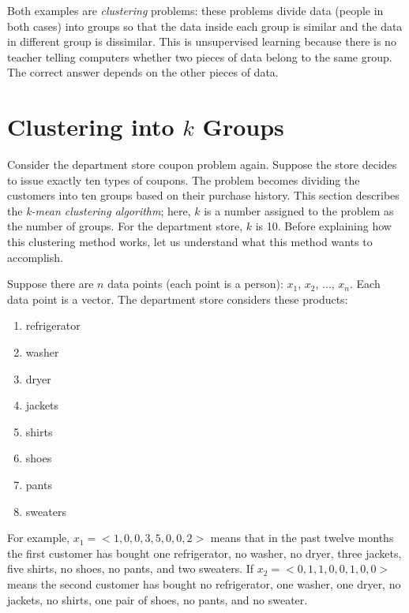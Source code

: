 
Both examples are {\it clustering} problems: these problems divide
data (people in both cases) into groups so that the data inside each
group is similar and the data in different group is dissimilar.  This
is unsupervised learning because there is no teacher telling computers
whether two pieces of data belong to the same group.  The correct
answer depends on the other pieces of data.


\section{Clustering into $k$ Groups}

Consider the department store coupon problem again. Suppose the store
decides to issue exactly ten types of coupons.  The problem becomes
dividing the customers into ten groups based on their purchase
history.  This section describes the {\it k-mean clustering
  algorithm}; here, $k$  is a
number assigned to the problem as the number of groups.  For the
department store, $k$ is 10.  Before explaining how this clustering
method works, let us understand what this method wants to accomplish.

Suppose there are $n$ data points (each point is a person): $x_1$,
$x_2$, ..., $x_n$. Each data point is a vector.
The department store considers these products:

\begin{enumerate}
\item refrigerator
\item washer
\item  dryer
\item  jackets
\item  shirts
\item  shoes
\item  pants
\item sweaters
\end{enumerate}  

For example, $x_1 = <1, 0, 0, 3, 5, 0, 0, 2>$ means that in the past
twelve months the first customer has bought one refrigerator, no
washer, no dryer, three jackets, five shirts, no shoes, no pants, and
two sweaters.  If $x_2 = <0, 1, 1, 0, 0, 1, 0, 0>$ means the second
customer has bought no refrigerator, one washer, one dryer, no
jackets, no shirts, one pair of shoes, no pants, and no sweater.

